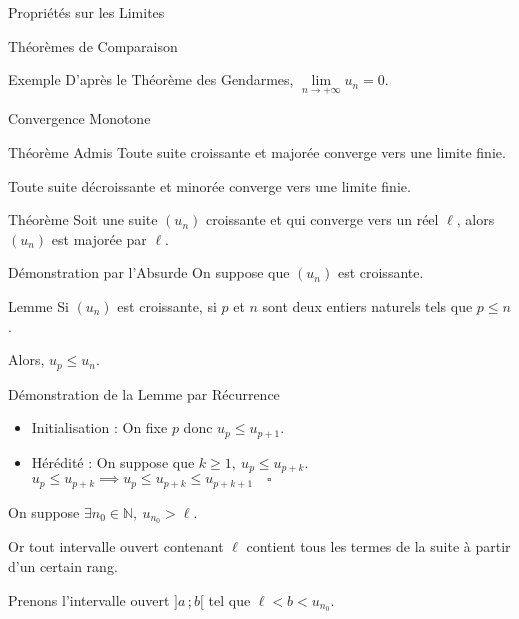 \documentclass{cours}
\begin{document}
\begin{Gpartie}{Propriétés sur les Limites}
\begin{Spartie}{Théorèmes de Comparaison}
\begin{SSpartie}{Exemple}
                D'après le Théorème des Gendarmes, $\lim\limits_{n\to +\infty}u_n=0$.
            \end{SSpartie}
        \end{Spartie}
        \pagebreak
        \begin{Spartie}{Convergence Monotone} 
            \begin{SSpartie}{Théorème Admis} 
                Toute suite croissante et majorée converge vers une limite finie.

                Toute suite décroissante et minorée converge vers une limite finie.
            \end{SSpartie}
            \begin{SSpartie}{Théorème} 
                Soit une suite $(u_n)$ croissante et qui converge vers un réel $\ell$, alors $(u_n)$ est majorée par $\ell$.
                \begin{SSSpartie}{Démonstration par l'Absurde} 
                    On suppose que $(u_n)$ est croissante.
                    \begin{SSSSpartie}{Lemme} 
                        Si $(u_n)$ est croissante, si $p$ et $n$ sont deux entiers naturels tels que $p\leq n$.

                        Alors, $u_p\leq u_n$.
                    \end{SSSSpartie}
                    \begin{SSSSpartie}{Démonstration de la Lemme par Récurrence}
                        \vspace{-1em}
                        \begin{itemize}
                            \item Initialisation : On fixe $p$ donc $u_p\leq u_{p+1}$.
                            \item Hérédité : On suppose que $k\geq 1,\ u_p\leq u_{p+k}$. \\
                            \phantom{Hérédité : }$u_p\leq u_{p+k}\implies u_p\leq u_{p+k}\leq u_{p+k+1}\quad\square$
                        \end{itemize}   
                    \end{SSSSpartie}
                    On suppose $\exists n_0\in\mathbb{N},\ u_{n_0}>\ell$.

                    Or tout intervalle ouvert contenant $\ell$ contient tous les termes de la suite à partir d'un certain rang.

                    Prenons l'intervalle ouvert $\big]a\,; b\big[$ tel que $\ell<b<u_{n_0}$.


\end{SSSpartie}
\end{SSpartie}
\end{Spartie}
\end{Gpartie}
\end{document}

